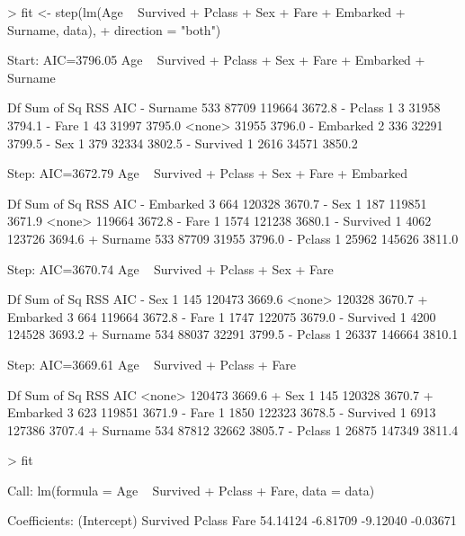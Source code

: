 \documentclass[11pt,french]{report}
\begin{document}
\begin{Schunk}
\begin{Sinput}
> fit <- step(lm(Age ~ Survived + Pclass + Sex + Fare + Embarked + Surname, data), 
+             direction = "both")
\end{Sinput}
\begin{Soutput}
Start:  AIC=3796.05
Age ~ Survived + Pclass + Sex + Fare + Embarked + Surname

            Df Sum of Sq    RSS    AIC
- Surname  533     87709 119664 3672.8
- Pclass     1         3  31958 3794.1
- Fare       1        43  31997 3795.0
<none>                    31955 3796.0
- Embarked   2       336  32291 3799.5
- Sex        1       379  32334 3802.5
- Survived   1      2616  34571 3850.2

Step:  AIC=3672.79
Age ~ Survived + Pclass + Sex + Fare + Embarked

            Df Sum of Sq    RSS    AIC
- Embarked   3       664 120328 3670.7
- Sex        1       187 119851 3671.9
<none>                   119664 3672.8
- Fare       1      1574 121238 3680.1
- Survived   1      4062 123726 3694.6
+ Surname  533     87709  31955 3796.0
- Pclass     1     25962 145626 3811.0

Step:  AIC=3670.74
Age ~ Survived + Pclass + Sex + Fare

            Df Sum of Sq    RSS    AIC
- Sex        1       145 120473 3669.6
<none>                   120328 3670.7
+ Embarked   3       664 119664 3672.8
- Fare       1      1747 122075 3679.0
- Survived   1      4200 124528 3693.2
+ Surname  534     88037  32291 3799.5
- Pclass     1     26337 146664 3810.1

Step:  AIC=3669.61
Age ~ Survived + Pclass + Fare

            Df Sum of Sq    RSS    AIC
<none>                   120473 3669.6
+ Sex        1       145 120328 3670.7
+ Embarked   3       623 119851 3671.9
- Fare       1      1850 122323 3678.5
- Survived   1      6913 127386 3707.4
+ Surname  534     87812  32662 3805.7
- Pclass     1     26875 147349 3811.4
\end{Soutput}
\begin{Sinput}
> fit
\end{Sinput}
\begin{Soutput}
Call:
lm(formula = Age ~ Survived + Pclass + Fare, data = data)

Coefficients:
(Intercept)     Survived       Pclass         Fare  
   54.14124     -6.81709     -9.12040     -0.03671  
\end{Soutput}
\end{Schunk}
\end{document}

